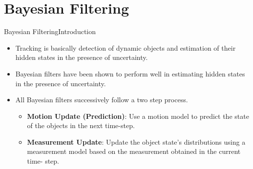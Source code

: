 \documentclass{beamer}
\begin{document}
\section{Bayesian Filtering}
\begin{frame}{Bayesian Filtering}{Introduction}
	\begin{itemize}
		\item Tracking is basically detection of dynamic objects and estimation of their hidden states in the presence of uncertainty.
		\item Bayesian filters have been shown to perform well in estimating hidden states in the presence of uncertainty.
		\item All Bayesian filters successively follow a two step process.
		\begin{itemize}
			\item \textbf{Motion Update (Prediction)}: Use a motion model to predict the state of the objects in the next time-step.
			\item  \textbf{Measurement Update}: Update the object state’s distributions using a measurement model based on the measurement obtained in the current time-
			step.
		\end{itemize}
	\end{itemize}
\end{frame}
\end{document}
